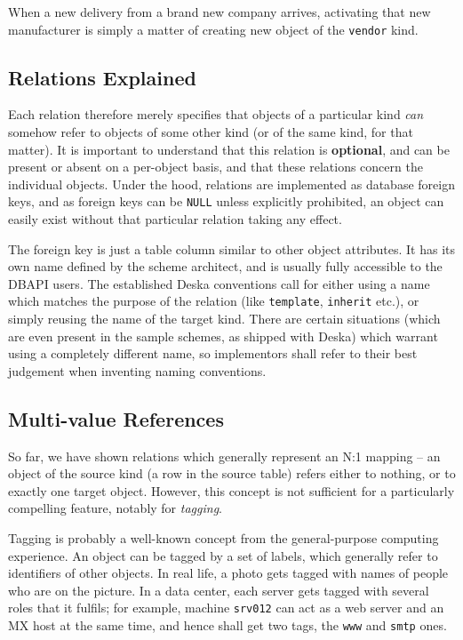 \documentclass[deska]{subfiles}
\begin{document}
When a new delivery from a brand new company arrives, activating that new manufacturer is simply a matter of
creating new object of the {\tt vendor} kind.

\subsection{Relations Explained}

Each relation therefore merely specifies that objects of a particular kind {\em can} somehow refer to objects of some
other kind (or of the same kind, for that matter).  It is important to understand that this relation is {\bf optional},
and can be present or absent on a per-object basis, and that these relations concern the individual objects.  Under the
hood, relations are implemented as database foreign keys, and as foreign keys can be {\tt NULL} unless explicitly
prohibited, an object can easily exist without that particular relation taking any effect.

The foreign key is just a table column similar to other object attributes.  It has its own name defined by the scheme
architect, and is usually fully accessible to the DBAPI users.  The established Deska conventions call for either using
a name which matches the purpose of the relation (like {\tt template}, {\tt inherit} etc.), or simply reusing the name
of the target kind.  There are certain situations (which are even present in the sample schemes, as shipped with Deska)
which warrant using a completely different name, so implementors shall refer to their best judgement when inventing
naming conventions.

\subsection{Multi-value References}

So far, we have shown relations which generally represent an N:1 mapping -- an object of the source kind (a row in the
source table) refers either to nothing, or to exactly one target object.  However, this concept is not sufficient for a
particularly compelling feature, notably for {\em tagging}.

Tagging is probably a well-known concept from the general-purpose computing experience. An object can be tagged by a set
of labels, which generally refer to identifiers of other objects.  In real life, a photo gets tagged with names of
people who are on the picture.  In a data center, each server gets tagged with several roles that it fulfils; for
example, machine {\tt srv012} can act as a web server and an MX host at the same time, and hence shall get two tags, the
{\tt www} and {\tt smtp} ones.
\end{document}
